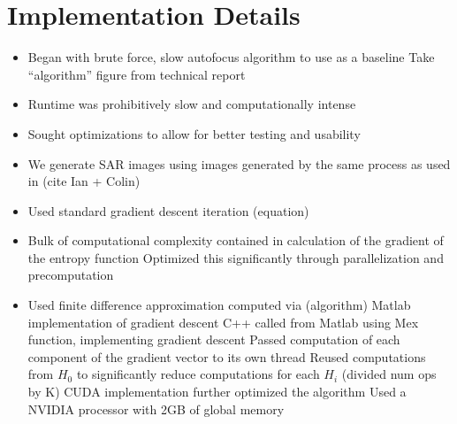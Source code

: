\section{Implementation Details}\label{sec:implementation}

\begin{itemize}
\item Began with brute force, slow autofocus algorithm to use as a baseline
\subitem Take “algorithm” figure from technical report
\item Runtime was prohibitively slow and computationally intense
  \item Sought optimizations to allow for better testing and usability
  \item We generate SAR images using images generated by the same process as used in (cite Ian + Colin)
\item Used standard gradient descent iteration (equation)
  \item Bulk of computational complexity contained in calculation of the gradient of the entropy function
  \subitem Optimized this significantly through parallelization and precomputation
\item Used finite difference approximation computed via (algorithm)
  \subitem Matlab implementation of gradient descent
  \subitem C++ called from Matlab using Mex function, implementing gradient descent
    \subsubitem Passed computation of each component of the gradient vector to its own thread
    \subsubitem Reused computations from $H_0$ to significantly reduce computations for each $H_i$ (divided num ops by K)
  \subitem CUDA implementation further optimized the algorithm
    \subsubitem Used a NVIDIA processor with 2GB of global memory
  \end{itemize}
